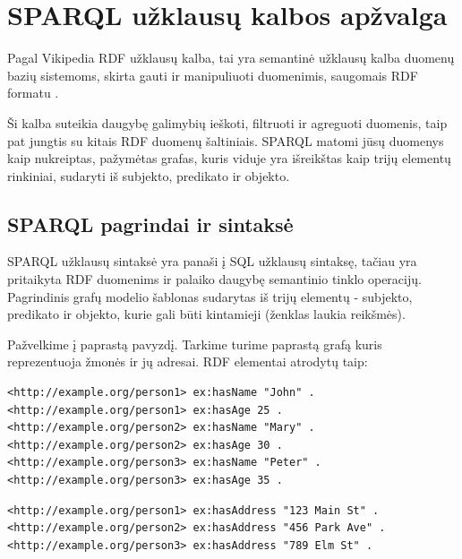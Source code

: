 \documentclass{VUMIFPSkursinis}
\begin{document}
\section{SPARQL užklausų kalbos apžvalga}
Pagal Vikipedia RDF užklausų kalba, tai yra semantinė užklausų kalba duomenų bazių sistemoms, skirta gauti ir manipuliuoti duomenimis, saugomais RDF formatu \cite{wiki:sparql}.

Ši kalba suteikia daugybę galimybių ieškoti, filtruoti ir agreguoti duomenis, taip pat jungtis su kitais RDF duomenų šaltiniais. SPARQL matomi jūsų duomenys kaip nukreiptas, pažymėtas grafas, kuris viduje yra išreikštas kaip trijų elementų rinkiniai, sudaryti iš subjekto, predikato ir objekto.

\subsection{SPARQL pagrindai ir sintaksė}
SPARQL užklausų sintaksė yra panaši į SQL užklausų sintaksę, tačiau yra pritaikyta RDF duomenims ir palaiko daugybę semantinio tinklo operacijų. Pagrindinis grafų modelio šablonas sudarytas iš trijų elementų - subjekto, predikato ir objekto, kurie gali būti kintamieji (ženklas laukia reikšmės).

Pažvelkime į paprastą pavyzdį. Tarkime turime paprastą grafą kuris reprezentuoja žmonės ir jų adresai.
RDF elementai atrodytų taip:

\begin{lstlisting}[captionpos=b, caption=Žmonių RDF, label=lst:sparql,
   basicstyle=\ttfamily,frame=single]
<http://example.org/person1> ex:hasName "John" .
<http://example.org/person1> ex:hasAge 25 .
<http://example.org/person2> ex:hasName "Mary" .
<http://example.org/person2> ex:hasAge 30 .
<http://example.org/person3> ex:hasName "Peter" .
<http://example.org/person3> ex:hasAge 35 .
\end{lstlisting}

\begin{lstlisting}[captionpos=b, caption=Adresų rdf, label=lst:sparql,
   basicstyle=\ttfamily,frame=single]
<http://example.org/person1> ex:hasAddress "123 Main St" .
<http://example.org/person2> ex:hasAddress "456 Park Ave" .
<http://example.org/person3> ex:hasAddress "789 Elm St" .
\end{lstlisting}
\end{document}
